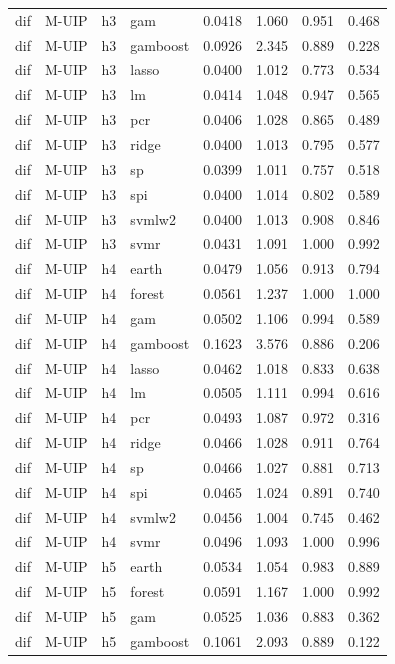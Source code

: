 \begin{ThreePartTable}
\begin{longtable}[t]{llclcccc}
dif & M-UIP & h3 & gam & 0.0418 & 1.060 & 0.951 & 0.468\\
dif & M-UIP & h3 & gamboost & 0.0926 & 2.345 & 0.889 & 0.228\\
dif & M-UIP & h3 & lasso & 0.0400 & 1.012 & 0.773 & 0.534\\
dif & M-UIP & h3 & lm & 0.0414 & 1.048 & 0.947 & 0.565\\
dif & M-UIP & h3 & pcr & 0.0406 & 1.028 & 0.865 & 0.489\\
dif & M-UIP & h3 & ridge & 0.0400 & 1.013 & 0.795 & 0.577\\
dif & M-UIP & h3 & sp & 0.0399 & 1.011 & 0.757 & 0.518\\
dif & M-UIP & h3 & spi & 0.0400 & 1.014 & 0.802 & 0.589\\
dif & M-UIP & h3 & svmlw2 & 0.0400 & 1.013 & 0.908 & 0.846\\
dif & M-UIP & h3 & svmr & 0.0431 & 1.091 & 1.000 & 0.992\\
\addlinespace
dif & M-UIP & h4 & earth & 0.0479 & 1.056 & 0.913 & 0.794\\
dif & M-UIP & h4 & forest & 0.0561 & 1.237 & 1.000 & 1.000\\
dif & M-UIP & h4 & gam & 0.0502 & 1.106 & 0.994 & 0.589\\
dif & M-UIP & h4 & gamboost & 0.1623 & 3.576 & 0.886 & 0.206\\
dif & M-UIP & h4 & lasso & 0.0462 & 1.018 & 0.833 & 0.638\\
dif & M-UIP & h4 & lm & 0.0505 & 1.111 & 0.994 & 0.616\\
dif & M-UIP & h4 & pcr & 0.0493 & 1.087 & 0.972 & 0.316\\
dif & M-UIP & h4 & ridge & 0.0466 & 1.028 & 0.911 & 0.764\\
dif & M-UIP & h4 & sp & 0.0466 & 1.027 & 0.881 & 0.713\\
dif & M-UIP & h4 & spi & 0.0465 & 1.024 & 0.891 & 0.740\\
dif & M-UIP & h4 & svmlw2 & 0.0456 & 1.004 & 0.745 & 0.462\\
dif & M-UIP & h4 & svmr & 0.0496 & 1.093 & 1.000 & 0.996\\
\addlinespace
dif & M-UIP & h5 & earth & 0.0534 & 1.054 & 0.983 & 0.889\\
dif & M-UIP & h5 & forest & 0.0591 & 1.167 & 1.000 & 0.992\\
dif & M-UIP & h5 & gam & 0.0525 & 1.036 & 0.883 & 0.362\\
dif & M-UIP & h5 & gamboost & 0.1061 & 2.093 & 0.889 & 0.122\\

\end{longtable}
\end{ThreePartTable}

